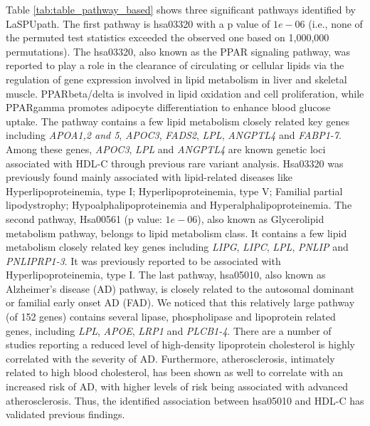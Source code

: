 \documentclass[12pt]{article}
\begin{document}
Table \ref{tab:table_pathway_based} shows three significant pathways identified by LaSPUpath. The first pathway is hsa03320 with a p value of $1e-06$ (i.e., none of the permuted test statistics exceeded the observed one based on 1,000,000 permutations). The hsa03320, also known as the PPAR signaling pathway, was reported to play a role in the clearance of circulating or cellular lipids via the regulation of gene expression involved in lipid metabolism in liver and skeletal muscle. PPARbeta/delta is involved in lipid oxidation and cell proliferation, while PPARgamma promotes adipocyte differentiation to enhance blood glucose uptake. The pathway contains a few lipid metabolism closely related key genes including \textit{APOA1,2 and 5}, \textit{APOC3}, \textit{FADS2}, \textit{LPL}, \textit{ANGPTL4} and \textit{FABP1-7}. Among these genes, \textit{APOC3}, \textit{LPL} and \textit{ANGPTL4} are known genetic loci associated with HDL-C through previous rare variant analysis.\cite{Peloso2014} Hsa03320 was previously found mainly associated with lipid-related diseases like Hyperlipoproteinemia, type I; Hyperlipoproteinemia, type V; Familial partial lipodystrophy; Hypoalphalipoproteinemia and Hyperalphalipoproteinemia. The second pathway, Hsa00561 (p value: $1e-06$), also known as Glycerolipid metabolism pathway, belongs to lipid metabolism class. It contains a few lipid metabolism closely related key genes including \textit{LIPG}, \textit{LIPC}, \textit{LPL}, \textit{PNLIP} and \textit{PNLIPRP1-3}. It was previously reported to be associated with Hyperlipoproteinemia, type I. The last pathway, hsa05010, also known as Alzheimer's disease (AD) pathway, is closely related to the autosomal dominant or familial early onset AD (FAD). We noticed that this relatively large pathway (of 152 genes) contains several lipase, phospholipase and lipoprotein related genes, including \textit{LPL}, \textit{APOE}, \textit{LRP1} and \textit{PLCB1-4}. There are a number of studies reporting a reduced level of high-density lipoprotein cholesterol is highly correlated with the severity of AD.\cite{Fernandes1999,Merched2000,Michikawa2003,Puglielli2003} Furthermore, atherosclerosis, intimately related to high blood cholesterol, has been shown as well to correlate with an increased risk of AD, with higher levels of risk being associated with advanced atherosclerosis.\cite{Hofman1997,Casserly2004} Thus, the identified association between hsa05010 and HDL-C has validated previous findings. 
\end{document}
